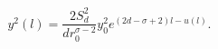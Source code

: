 \begin{equation}
\label{effecfug}
y^2(l)=\frac{2S_d^2}{d r_0^{\sigma-2}}y_0^2 e^{(2d-\sigma+2)l-u(l)}.
\end{equation}

